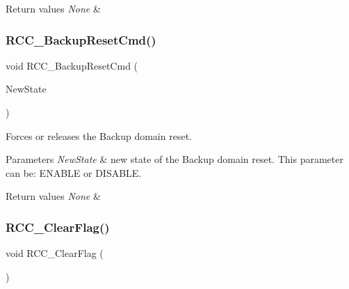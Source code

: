 \begin{DoxyRetVals}{Return values}
{\em None} & \\
\hline
\end{DoxyRetVals}
\mbox{\label{group___r_c_c___private___functions_ga636c3b72f35391e67f12a551b15fa54a}} 
\subsubsection{\texorpdfstring{RCC\_BackupResetCmd()}{RCC\_BackupResetCmd()}}
{\footnotesize\ttfamily void R\+C\+C\+\_\+\+Backup\+Reset\+Cmd (\begin{DoxyParamCaption}\item[{\mbox{\hyperlink{group___exported__types_gac9a7e9a35d2513ec15c3b537aaa4fba1}{Functional\+State}}}]{New\+State }\end{DoxyParamCaption})}



Forces or releases the Backup domain reset. 


\begin{DoxyParams}{Parameters}
{\em New\+State} & new state of the Backup domain reset. This parameter can be\+: E\+N\+A\+B\+LE or D\+I\+S\+A\+B\+LE. \\
\hline
\end{DoxyParams}

\begin{DoxyRetVals}{Return values}
{\em None} & \\
\hline
\end{DoxyRetVals}
\mbox{\label{group___r_c_c___private___functions_ga53f909dbb15a54124419084ebda97d72}} 
\subsubsection{\texorpdfstring{RCC\_ClearFlag()}{RCC\_ClearFlag()}}
{\footnotesize\ttfamily void R\+C\+C\+\_\+\+Clear\+Flag (\begin{DoxyParamCaption}\item[{void}]{ }\end{DoxyParamCaption})}



